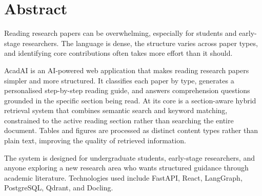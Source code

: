 \documentclass[12pt,a4paper]{report}
\begin{document}
\newpage

\chapter*{Abstract}

Reading research papers can be overwhelming, especially for students and
early-stage researchers. The language is dense, the structure varies across
paper types, and identifying core contributions often takes more effort than it
should.

AcadAI is an AI-powered web application that makes reading research papers
simpler and more structured. It classifies each paper by type, generates a
personalised step-by-step reading guide, and answers comprehension questions
grounded in the specific section being read. At its core is a section-aware
hybrid retrieval system that combines semantic search and keyword matching,
constrained to the active reading section rather than searching the entire
document. Tables and figures are processed as distinct content types rather than
plain text, improving the quality of retrieved information.

The system is designed for undergraduate students, early-stage researchers, and
anyone exploring a new research area who wants structured guidance through
academic literature. Technologies used include FastAPI, React, LangGraph,
PostgreSQL, Qdrant, and Docling.

\newpage

\tableofcontents
{}
\newpage

\listoffigures
{}
\newpage

\listoftables
{}
\newpage

\end{document}
